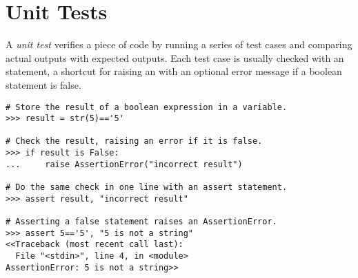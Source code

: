 \label{lab:PythonEssentials:UnitTesting}


\section*{Unit Tests} %

A \emph{unit test} verifies a piece of code by running a series of test cases and comparing actual outputs with expected outputs.
Each test case is usually checked with an  statement, a shortcut for raising an  with an optional error message if a boolean statement is false.

\begin{lstlisting}
# Store the result of a boolean expression in a variable.
>>> result = str(5)=='5'

# Check the result, raising an error if it is false.
>>> if result is False:
...     raise AssertionError("incorrect result")

# Do the same check in one line with an assert statement.
>>> assert result, "incorrect result"

# Asserting a false statement raises an AssertionError.
>>> assert 5=='5', "5 is not a string"
<<Traceback (most recent call last):
  File "<stdin>", line 4, in <module>
AssertionError: 5 is not a string>>
\end{lstlisting}

